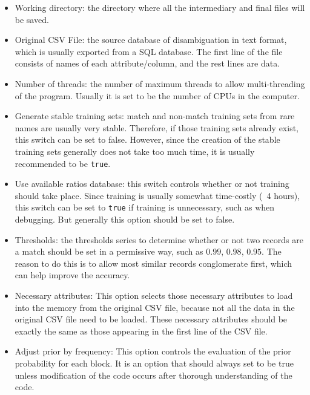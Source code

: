 \documentclass{article}
\begin{document}
\begin{itemize}

\item Working directory: the directory where all the intermediary 
and final files will be saved.

\item Original CSV File: the source database of disambiguation in 
text format, which is usually exported from a SQL database. 
The first line of the file consists of names of each
attribute/column, and the rest lines are data.

\item Number of threads: the number of maximum threads to
allow multi-threading of the program. Usually it is set to
be the number of CPUs in the computer.

\item  Generate stable training sets: match and non-match
training sets from rare names are usually very stable. Therefore,
if those training sets already exist, this switch can be set
to false. However, since the creation of the stable
training sets generally does not take too much time,
it is usually recommended to be \texttt{true}.


\item Use available ratios database: this switch controls
whether or not training should take place. Since training is
usually somewhat time-costly (~4 hours), this switch can be
set to \texttt{true} if training is unnecessary, such as
when debugging. But generally this option should be set to false.

\item Thresholds: the thresholds series to determine whether
or not two records are a match should be set in a permissive way,
such as $0.99$, $0.98$, $0.95$. The reason to do this is to allow most
similar records conglomerate first, which can help improve the accuracy.

\item Necessary attributes: This option selects those necessary
attributes to load into the memory from the original CSV file,
because not all the data in the original CSV file need to be loaded.
These necessary attributes should be exactly the same as those
appearing in the first line of the CSV file.

\item Adjust prior by frequency: This option controls the evaluation 
of the prior probability for each block. It is an option that
should always set to be true unless modification of the code
occurs after thorough understanding of the code.


\end{itemize}
\end{document}
